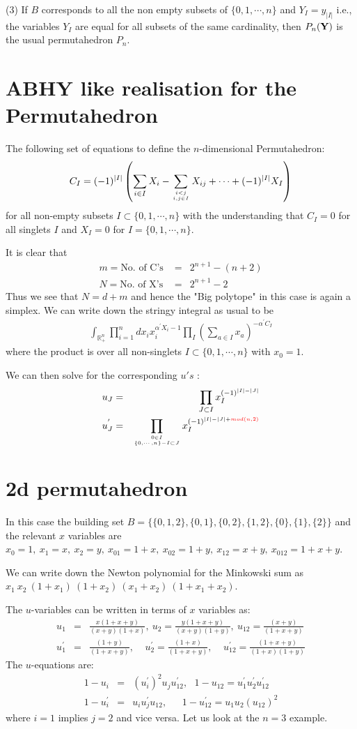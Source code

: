 \documentclass[hidelinks,12pt]{article}
\newcommand{\bea}[1]{\begin{eqnarray}\label{#1} }
\newcommand{\eea}{\end{eqnarray}}
\def\bea{\begin{eqnarray}}
\def\eea{\end{eqnarray}}
\begin{document}
(3) If $B$ corresponds to all the non empty subsets of $\{0,1,\cdots,n \}$ and $Y_I =y_{|I|}$ i.e., the variables $Y_I$ are equal for all subsets of the same cardinality, then $P_n({\bf Y})$ is the usual permutahedron $P_n$. 

\section*{ABHY like realisation for the Permutahedron}
The following set of equations to define the $n$-dimensional Permutahedron: 
\bea
C_I = (-1)^{|I|} \left( \sum_{i \in I} X_i - \sum _{{i<j}\atop{i,j \in I}} X_{ij} +\cdots + (-1)^{|I|}  X_I \right) \nonumber
\eea
for all non-empty subsets $I \subset \{0,1,\cdots,n\}$ with the understanding that $C_{I} =0$ for all singlets $I$ and $X_{I} =0$ for $I=\{ 0,1,\cdots,n \}$. 

It is clear that
\bea
m= \text{No. of  C's }&=& 2^{n+1}-(n+2) \nonumber \\
N= \text{No. of X's} &=& 2^{n+1}- 2 \nonumber 
\eea
Thus we see that $N= d+m$ and hence the "Big polytope" in this case is again a simplex. We can write down the stringy integral as usual to be 
\bea
\int_{\mathbb{R}^{n}_{+}} \prod_{i =1}^{n} d x_i x_i^{\alpha^{'} X_i -1} \prod_{I} \left (\sum_{a\in I} x_a \right) ^{-\alpha^{'} C_I} \nonumber
\eea 
where the product is over all non-singlets $ I \subset \{0,1,\cdots,n\}$ with $x_{0} =1$.

We can then solve for the corresponding $u's$ :
\bea
u_J &=& ~~\prod_{J \subset I} x_I^{(-1)^{|I|-|J|}} \nonumber \\
u^{'}_J &=& \prod_{{0 \in I}\atop{ \{0,\cdots,n\} - I \subset J}} x_I^{(-1)^{|I|-|J|+\color{red}{mod(n, 2)}}} \nonumber
\eea

\section*{2d permutahedron}
In this case the building set $B=\{ \{ 0,1,2\},\{ 0,1\},\{0,2\},\{1,2\},\{0\},\{1\},\{2\}\}$ and the relevant $x$ variables are $x_0=1, ~x_1=x, ~x_2=y, ~x_{01}=1+x, ~x_{02}=1+y,~ x_{12}=x+y,~ x_{012}=1+x+y$. 

We can write down the Newton polynomial for the Minkowski sum as $ x_1~ x_2~(1+x_1)~(1+x_2)~(x_1+x_2)~(1+x_1+x_2)$.

The $u$-variables can be written in terms of $x$ variables as:
\bea
u_1&=&\frac{x(1+x+y)}{(x+y)(1+x)}, ~ u_2 =\frac{y(1+x+y)}{(x+y)(1+y)},~ u_{12}=\frac{(x+y)}{(1+x+y)}\nonumber \\
u^{'}_1&=&\frac{(1+y)}{(1+x+y)}, ~~~~~ u^{'}_2=\frac{(1+x)}{(1+x+y)},~~~~~ u^{'}_{12}= \frac{(1+x+y)}{(1+x)(1+y)} \nonumber
\eea
The $u$-equations are:
\bea
1-u_i &=& (u^{'}_i)^2 u_j u^{'}_{12}, ~~~ 1-u_{12} = u^{'}_{1} u^{'}_{2} u^{'}_{12} \nonumber \\
1-u^{'}_i &=& u_i u^{'}_j u_{12}, ~~~~~~~ 1-u^{'}_{12} = u_{1} u_{2} (u_{12})^2 \nonumber
\eea
where $i=1$ implies $j=2$ and vice versa.
Let us look at the $n=3$ example.
\end{document}
